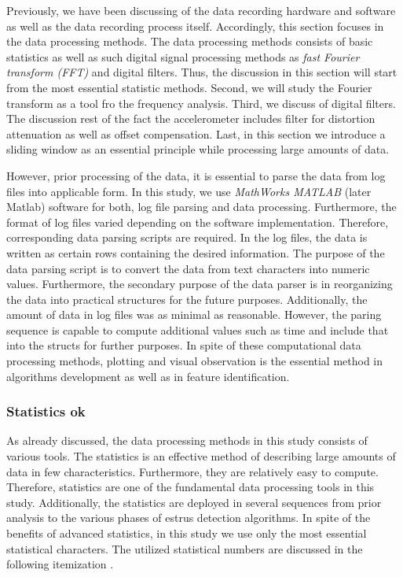 \documentclass[english,12pt,a4paper,pdftex,elec,utf8]{aaltothesis}
\begin{document}
Previously, we have been discussing of the data recording hardware and software as well as the data recording process itself. Accordingly, this section focuses in the data processing methods. The data processing methods consists of basic statistics as well as such digital signal processing methods as \textit{fast Fourier transform (FFT)} and digital filters. Thus, the discussion in this section will start from the most essential statistic methods. Second, we will study the Fourier transform as a tool fro the frequency analysis. Third, we discuss of digital filters. The discussion rest of the fact the accelerometer includes filter for distortion attenuation as well as offset compensation. Last, in this section we introduce a sliding window as an essential principle while processing large amounts of data.

However, prior processing of the data, it is essential to parse the data from log files into applicable form. In this study, we use \textit{MathWorks MATLAB} (later Matlab) \cite{matlaboverview} software for both, log file parsing and data processing. Furthermore, the format of log files varied depending on the software implementation. Therefore, corresponding data parsing scripts are required. In the log files, the data is written as certain rows containing the desired information. The purpose of the data parsing script is to convert the data from text characters into numeric values. Furthermore, the secondary purpose of the data parser is in reorganizing the data into practical structures for the future purposes. Additionally, the amount of data in log files was as minimal as reasonable. However, the paring sequence is capable to compute additional values such as time and include that into the structs for further purposes. In spite of these computational data processing methods, plotting and visual observation is the essential method in algorithms development as well as in feature identification.

\subsubsection{Statistics ok} \label{statisticssection}

As already discussed, the data processing methods in this study consists of various tools. The statistics is an effective method of describing large amounts of data in few characteristics. Furthermore, they are relatively easy to compute. Therefore, statistics are one of the fundamental data processing tools in this study. Additionally, the statistics are deployed in several sequences from prior analysis to the various phases of estrus detection algorithms. In spite of the benefits of advanced statistics, in this study we use only the most essential statistical characters. The utilized statistical numbers are discussed in the following itemization \cite{maoltaulukotmatematiikka}.
\end{document}
